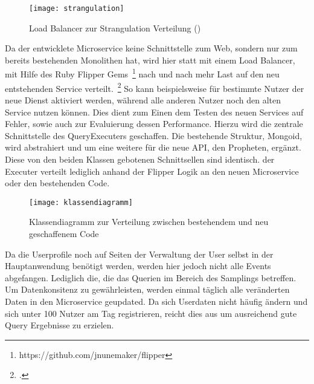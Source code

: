 \begin{figure}[h]
    \caption{Load Balancer zur Strangulation Verteilung (\cite{Hammant:Strangler})}
    \texttt{[image: strangulation]}
\end{figure}

Da der entwicklete Microservice keine Schnittstelle zum Web, sondern nur zum bereits bestehenden Monolithen hat, wird hier statt mit einem Load Balancer, mit Hilfe des Ruby Flipper Gems~\footnote{https://github.com/jnunemaker/flipper} nach und nach mehr Last auf den neu entstehenden Service verteilt.~\footcite[vgl.][]{Hammant:Strangler} So kann beispielsweise für bestimmte Nutzer der neue Dienst aktiviert werden, während alle anderen Nutzer noch den alten Service nutzen können. Dies dient zum Einen dem Testen des neuen Services auf Fehler, sowie auch zur Evaluierung dessen Performance.
Hierzu wird die zentrale Schnittstelle des QueryExecuters geschaffen. Die bestehende Struktur, Mongoid, wird abstrahiert und um eine weitere für die neue API, den Propheten, ergänzt. Diese von den beiden Klassen gebotenen Schnittsellen sind identisch. der Executer verteilt lediglich anhand der Flipper Logik an den neuen Microservice oder den bestehenden Code.
\begin{figure}[h]
    \centering
    \caption{Klassendiagramm zur Verteilung zwischen bestehendem und neu geschaffenem Code}
    \texttt{[image: klassendiagramm]}
\end{figure}

Da die Userprofile noch auf Seiten der Verwaltung der User selbst in der Hauptanwendung benötigt werden, werden hier jedoch nicht alle Events abgefangen. Lediglich die, die das Querien im Bereich des Samplings betreffen. Um Datenkonsitenz zu gewährleisten, werden einmal täglich alle veränderten Daten in den Microservice geupdated. Da sich Userdaten nicht häufig ändern und sich unter 100 Nutzer am Tag registrieren, reicht dies aus um ausreichend gute Query Ergebnisse zu erzielen.